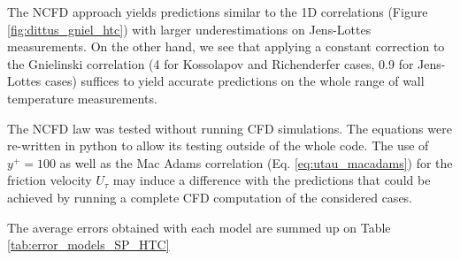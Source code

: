 \npar
The NCFD approach yields predictions similar to the 1D correlations (Figure \ref{fig:dittus_gniel_htc}) with larger underestimations on Jens-Lottes measurements. On the other hand, we see that applying a constant correction to the Gnielinski correlation (4 for Kossolapov and Richenderfer cases, 0.9 for Jens-Lottes cases) suffices to yield accurate predictions on the whole range of wall temperature measurements. 

\begin{remark*}{}
The NCFD law was tested without running CFD simulations. The equations were re-written in python to allow its testing outside of the whole code. The use of $y^{+}=100$ as well as the Mac Adams correlation (Eq. \ref{eq:utau_macadams}) for the friction velocity $U_{\tau}$ may induce a difference with the predictions that could be achieved by running a complete CFD computation of the considered cases.
\end{remark*}

\npar
The average errors obtained with each model are summed up on Table \ref{tab:error_models_SP_HTC}

\begin{table}[h!]


\noindent{}
\caption{Average errors achieved by the considered models on each data sets.}
\label{tab:error_models_SP_HTC}
\end{table}


